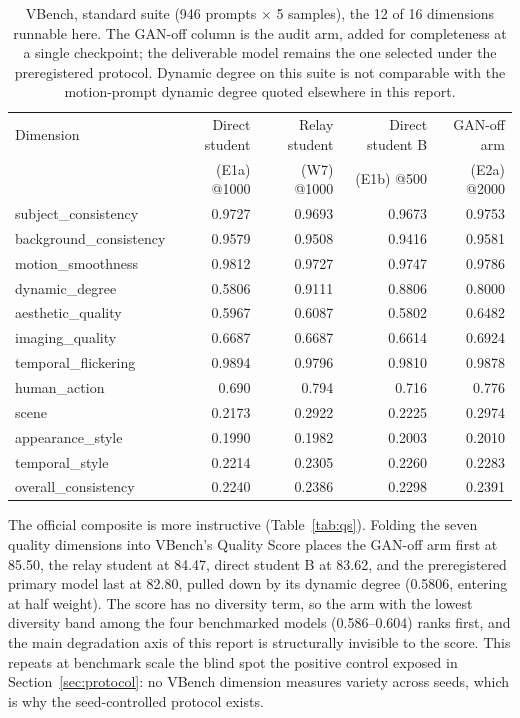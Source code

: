 \documentclass[11pt,a4paper]{article}
\begin{document}
\begin{table}[htbp]
  \centering
  \footnotesize
  \setlength{\tabcolsep}{4pt}
  \begin{tabular}{lrrrr}
    \toprule
    Dimension & Direct student & Relay student & Direct student B & GAN-off arm \\
              & (E1a) @1000 & (W7) @1000 & (E1b) @500 & (E2a) @2000 \\
    \midrule
    subject\_consistency & 0.9727 & 0.9693 & 0.9673 & 0.9753 \\
    background\_consistency & 0.9579 & 0.9508 & 0.9416 & 0.9581 \\
    motion\_smoothness & 0.9812 & 0.9727 & 0.9747 & 0.9786 \\
    dynamic\_degree & 0.5806 & 0.9111 & 0.8806 & 0.8000 \\
    aesthetic\_quality & 0.5967 & 0.6087 & 0.5802 & 0.6482 \\
    imaging\_quality & 0.6687 & 0.6687 & 0.6614 & 0.6924 \\
    temporal\_flickering & 0.9894 & 0.9796 & 0.9810 & 0.9878 \\
    human\_action & 0.690 & 0.794 & 0.716 & 0.776 \\
    scene & 0.2173 & 0.2922 & 0.2225 & 0.2974 \\
    appearance\_style & 0.1990 & 0.1982 & 0.2003 & 0.2010 \\
    temporal\_style & 0.2214 & 0.2305 & 0.2260 & 0.2283 \\
    overall\_consistency & 0.2240 & 0.2386 & 0.2298 & 0.2391 \\
    \bottomrule
  \end{tabular}
  \caption{VBench, standard suite (946 prompts $\times$ 5 samples), the 12 of 16 dimensions runnable here. The GAN-off column is the audit arm, added for completeness at a single checkpoint; the deliverable model remains the one selected under the preregistered protocol. Dynamic degree on this suite is not comparable with the motion-prompt dynamic degree quoted elsewhere in this report.}
  \label{tab:vbench}
\end{table}

The official composite is more instructive (Table~\ref{tab:qs}). Folding the seven quality dimensions into VBench's Quality Score places the GAN-off arm first at 85.50, the relay student at 84.47, direct student B at 83.62, and the preregistered primary model last at 82.80, pulled down by its dynamic degree (0.5806, entering at half weight). The score has no diversity term, so the arm with the lowest diversity band among the four benchmarked models (0.586–0.604) ranks first, and the main degradation axis of this report is structurally invisible to the score. This repeats at benchmark scale the blind spot the positive control exposed in Section~\ref{sec:protocol}: no VBench dimension measures variety across seeds, which is why the seed-controlled protocol exists.
\end{document}
